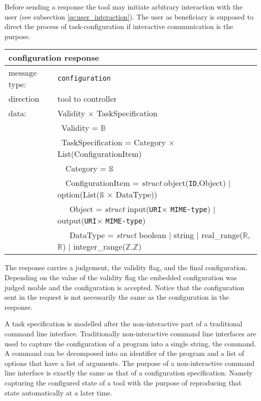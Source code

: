 \documentclass{article}
\newcommand{\msg}[1]{\texttt{#1}}
\newcommand{\String}{\ensuremath \mathbb{S}\xspace}
\newcommand{\Id}{\texttt{ID}\xspace}
\newcommand{\URI}{\texttt{URI}\xspace}
\newcommand{\MIMEtype}{\texttt{MIME-type}\xspace}
\begin{document}
   Before sending a response the tool may initiate arbitrary interaction with
   the user (see subsection \ref{ss:user_interaction}). The user as beneficiary
   is supposed to direct the process of task-configuration if interactive
   communication is the purpose.

   \begin{table}[H]
    \begin{center}
     \begin{tabular}{|ll|}
      \hline
       \multicolumn{2}{|l|}{\textbf{configuration response}} \\
      \hline
       message type:   & \msg{configuration} \\
      \hline
       direction       & tool to controller \\
      \hline
       data:           & Validity $\times$ TaskSpecification \\
                       & \ Validity = $\mathbb{B}$ \\
                       & \ TaskSpecification = Category $\times$ List(ConfigurationItem) \\
                       & \ \ Category = $\String$ \\
                       & \ \ ConfigurationItem = \textit{struct} object(\Id,Object) $|$ option(List($\String$ $\times$ DataType)) \\
                       & \ \ \ Object = \textit{struct} input(\URI $\times$ \MIMEtype) $|$ output(\URI $\times$ \MIMEtype) \\
                       & \ \ \ DataType = \textit{struct} boolean $|$ string $|$ real\_range($\mathbb{R}$,$\mathbb{R}$) $|$ integer\_range($\mathbb{Z}$,$\mathbb{Z}$) \\
      \hline
     \end{tabular}
    \end{center}
    \vspace{-0.4cm}
   \end{table}

   \noindent The response carries a judgement, the validity flag, and the final
   configuration.  Depending on the value of the validity flag the embedded
   configuration was judged usable and the configuration is accepted. Notice
   that the configuration sent in the request is not necessarily the same as
   the configuration in the response.

   A task specification  is modelled after the non-interactive part of a
   traditional command line interface.  Traditionally non-interactive command
   line interfaces are used to capture the configuration of a program into a
   single string, the command. A command can be decomposed into an identifier
   of the program and a list of options that have a list of arguments. The
   purpose of a non-interactive command line interface is exactly the same as
   that of a configuration specification.  Namely capturing the configured
   state of a tool with the purpose of reproducing that state automatically at
   a later time.
\end{document}
